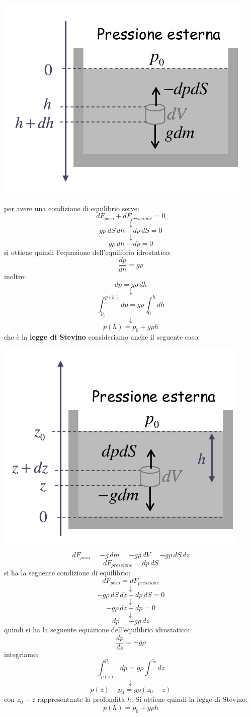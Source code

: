 \documentclass[a4paper,12pt, oneside]{book}
\begin{document}
\begin{center}
\includegraphics[scale=0.5]{img/flu3.png}
\end{center}
per avere una condizione di equilibrio serve:
$$dF_{peso}+dF_{pressione}=0$$
$$\downarrow$$
$$g\rho \,dS\,dh-dp\,dS=0$$
$$\downarrow$$
$$g\rho \,dh-dp=0$$
si ottiene quindi l'equazione dell'equilibrio idrostatico:
$$\frac{dp}{dh}=g\rho$$
inoltre:
$$dp=g\rho\,dh$$
$$\downarrow$$
$$\int_{p_0}^{p(h)}dp=g\rho\int_0^hdh$$
$$\downarrow$$
$$p(h)=p_0+g\rho h$$
che è la \textbf{legge di Stevino}
\newpage
consideriamo anche il seguente caso:
\begin{center}
\includegraphics[scale=0.5]{img/flu4.png}
\end{center}
$$dF_{peso}=-g\,dm=-g\rho\, dV=-g\rho\, dS\,dz$$
$$dF_{pressione}=dp\,dS$$
si ha la seguente condizione di equilibrio:
$$dF_{peso}=dF_{pressione}$$
$$\downarrow$$
$$-g\rho\, dS\,dz+dp\,dS=0$$
$$\downarrow$$
$$-g\rho\,dz+dp=0$$
$$\downarrow$$
$$dp=-g\rho\,dz$$
quindi si ha la seguente equazione dell'equilibrio idrostatico:
$$\frac{dp}{dz}=-g\rho$$
integriamo:
$$\int_{p(z)}^{p_0}dp=g\rho\int_z^{z_0}dz$$
$$\downarrow$$
$$p(z)-p_0=g\rho(z_0-z)$$
con $z_0-z$ rappresentante la profondità $h$. Si ottiene quindi la legge di Stevino:
$$p(h)=p_0+g\rho h$$
\end{document}
